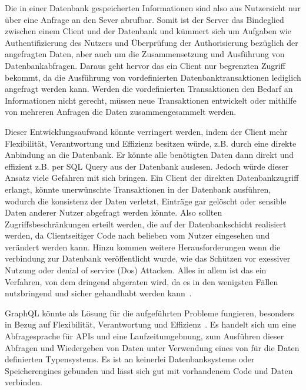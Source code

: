 Die in einer Datenbank gespeicherten Informationen sind also aus Nutzersicht nur über eine Anfrage an den Sever abrufbar.
Somit ist der Server das Bindeglied zwischen einem Client und der Datenbank und kümmert sich um Aufgaben wie Authentifizierung des Nutzers
und Überprüfung der Authorisierung bezüglich der angefragten Daten, aber auch um die Zusammensetzung und Ausführung von Datenbankabfragen.
Daraus geht hervor das ein Client nur begrenzten Zugriff bekommt, da die Ausführung von vordefinierten Datenbanktransaktionen
lediglich angefragt werden kann. Werden die vordefinierten Transaktionen den Bedarf an Informationen nicht gerecht, müssen neue Transaktionen entwickelt
oder mithilfe von mehreren Anfragen die Daten zusammengesammelt werden.

Dieser Entwicklungsaufwand könnte verringert werden, indem der Client mehr Flexibilität, Verantwortung und Effizienz besitzen würde,
z.B. durch eine direkte Anbindung an die Datenbank.
Er könnte alle benötigten Daten dann direkt und effizient z.B. per SQL Query aus der Datenbank auslesen.
Jedoch würde dieser Ansatz viele Gefahren mit sich bringen. Ein Client der direkten Datenbankzugriff erlangt,
könnte unerwünschte Transaktionen in der Datenbank ausführen, wodurch die konsistenz der Daten verletzt,
Einträge gar gelöscht oder sensible Daten anderer Nutzer abgefragt werden könnte. Also sollten Zugriffsbeschränkungen erteilt werden, die
auf der Datenbankschicht realisiert werden, da Clientseitiger Code nach belieben vom Nutzer eingesehen und verändert werden kann.
Hinzu kommen weitere Herausforderungen wenn die verbindung zur Datenbank veröffentlicht wurde,
wie das Schützen vor exessiver Nutzung oder denial of service (Dos) Attacken.
Alles in allem ist das ein Verfahren, von dem dringend abgeraten wird, da es in den wenigsten Fällen nutzbringend und sicher gehandhabt werden kann~\cite{client-to-database}.


GraphQL könnte als Lösung für die aufgeführten Probleme fungieren, besonders in Bezug auf Flexibilität, Verantwortung und Effizienz~\cite{graphql-scalablepath}.
Es handelt sich um eine Abfragesprache für APIs
und eine Laufzeitumgebnung, zum Ausführen dieser Abfragen und Wiedergeben von Daten unter Verwendung eines von für die Daten definierten Typensystems.
Es ist an keinerlei Datenbanksysteme oder Speicherengines gebunden und lässt sich gut mit vorhandenem Code und Daten verbinden.

